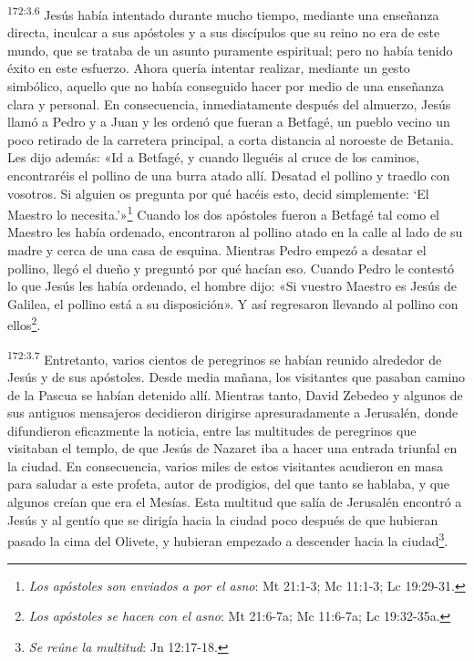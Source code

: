 \par
\textsuperscript{172:3.6} Jesús había intentado durante mucho tiempo, mediante una enseñanza directa, inculcar a sus apóstoles y a sus discípulos que su reino no era de este mundo, que se trataba de un asunto puramente espiritual; pero no había tenido éxito en este esfuerzo. Ahora quería intentar realizar, mediante un gesto simbólico, aquello que no había conseguido hacer por medio de una enseñanza clara y personal. En consecuencia, inmediatamente después del almuerzo, Jesús llamó a Pedro y a Juan y les ordenó que fueran a Betfagé, un pueblo vecino un poco retirado de la carretera principal, a corta distancia al noroeste de Betania. Les dijo además: «Id a Betfagé, y cuando lleguéis al cruce de los caminos, encontraréis el pollino de una burra atado allí. Desatad el pollino y traedlo con vosotros. Si alguien os pregunta por qué hacéis esto, decid simplemente: `El Maestro lo necesita.'»\footnote{\textit{Los apóstoles son enviados a por el asno}: Mt 21:1-3; Mc 11:1-3; Lc 19:29-31.} Cuando los dos apóstoles fueron a Betfagé tal como el Maestro les había ordenado, encontraron al pollino atado en la calle al lado de su madre y cerca de una casa de esquina. Mientras Pedro empezó a desatar el pollino, llegó el dueño y preguntó por qué hacían eso. Cuando Pedro le contestó lo que Jesús les había ordenado, el hombre dijo: «Si vuestro Maestro es Jesús de Galilea, el pollino está a su disposición». Y así regresaron llevando al pollino con ellos\footnote{\textit{Los apóstoles se hacen con el asno}: Mt 21:6-7a; Mc 11:6-7a; Lc 19:32-35a.}.

\par
\textsuperscript{172:3.7} Entretanto, varios cientos de peregrinos se habían reunido alrededor de Jesús y de sus apóstoles. Desde media mañana, los visitantes que pasaban camino de la Pascua se habían detenido allí. Mientras tanto, David Zebedeo y algunos de sus antiguos mensajeros decidieron dirigirse apresuradamente a Jerusalén, donde difundieron eficazmente la noticia, entre las multitudes de peregrinos que visitaban el templo, de que Jesús de Nazaret iba a hacer una entrada triunfal en la ciudad. En consecuencia, varios miles de estos visitantes acudieron en masa para saludar a este profeta, autor de prodigios, del que tanto se hablaba, y que algunos creían que era el Mesías. Esta multitud que salía de Jerusalén encontró a Jesús y al gentío que se dirigía hacia la ciudad poco después de que hubieran pasado la cima del Olivete, y hubieran empezado a descender hacia la ciudad\footnote{\textit{Se reúne la multitud}: Jn 12:17-18.}.

